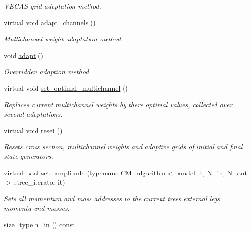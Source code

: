 \begin{DoxyCompactItemize}
\begin{DoxyCompactList}\small\item\em V\+E\+G\+A\+S-\/grid adaptation method. \end{DoxyCompactList}\item 
\hypertarget{a00450_aee5d39cdf937f3399d682e95d19f1fb6}{}virtual void \hyperlink{a00450_aee5d39cdf937f3399d682e95d19f1fb6}{adapt\+\_\+channels} ()\label{a00450_aee5d39cdf937f3399d682e95d19f1fb6}

\begin{DoxyCompactList}\small\item\em Multichannel weight adaptation method. \end{DoxyCompactList}\item 
\hypertarget{a00450_aaa93653cd53498e56183fa5857b396ea}{}void \hyperlink{a00450_aaa93653cd53498e56183fa5857b396ea}{adapt} ()\label{a00450_aaa93653cd53498e56183fa5857b396ea}

\begin{DoxyCompactList}\small\item\em Overridden adaption method. \end{DoxyCompactList}\item 
virtual void \hyperlink{a00450_a1cf371f098235bf3735048b78ee3bb09}{set\+\_\+optimal\+\_\+multichannel} ()
\begin{DoxyCompactList}\small\item\em Replaces current multichannel weights by there optimal values, collected over several adaptations. \end{DoxyCompactList}\item 
virtual void \hyperlink{a00450_a205f3c5d763897f3d031ded8e0b99dc0}{reset} ()
\begin{DoxyCompactList}\small\item\em Resets cross section, multichannel weights and adaptive grids of initial and final state generators. \end{DoxyCompactList}\item 
virtual bool \hyperlink{a00450_a4a4cfc3609859a5530982e6252012202}{set\+\_\+amplitude} (typename \hyperlink{a00065}{C\+M\+\_\+algorithm}$<$ model\+\_\+t, N\+\_\+in, N\+\_\+out $>$\+::tree\+\_\+iterator it)
\begin{DoxyCompactList}\small\item\em Sets all momentum and mass addresses to the current tree\textquotesingle{}s external legs momenta and masses. \end{DoxyCompactList}\item 
\hypertarget{a00450_a65d6bc1d66794e4681960e19706d17c3}{}size\+\_\+type \hyperlink{a00450_a65d6bc1d66794e4681960e19706d17c3}{n\+\_\+in} () const \label{a00450_a65d6bc1d66794e4681960e19706d17c3}


\end{DoxyCompactItemize}
